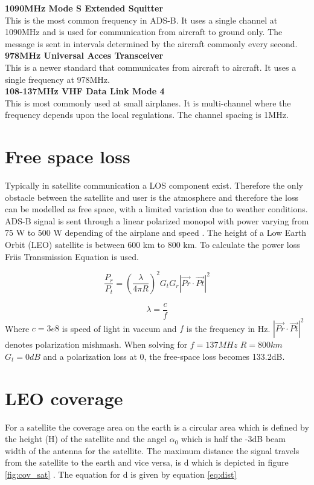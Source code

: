 \textbf{1090MHz Mode S Extended Squitter}\\
This is the most common frequency in ADS-B. It uses a single channel at 1090MHz and is used for communication from aircraft to ground only. The message is sent in intervals determined by the aircraft commonly every second.   
\\
\textbf{978MHz Universal Acces Transceiver}\\
This is a newer standard that communicates from aircraft to aircraft. It uses a single frequency at 978MHz.  
\\
\textbf{108-137MHz VHF Data Link Mode 4}\\
This is most commonly used at small airplanes. It is multi-channel where the frequency depends upon the local regulations. The channel spacing is 1MHz. 

\section{Free space loss}

Typically in satellite communication a LOS component exist. Therefore the only obstacle between the satellite and user is the atmosphere and therefore the loss can be modelled as free space, with a limited variation due to weather conditions. ADS-B signal is sent through a linear polarized monopol with power varying from 75 W to 500 W depending of the airplane and speed \citep{FlyingLab}. The height of a Low Earth Orbit (LEO) satellite is between 600 km to 800 km. To calculate the power loss Friis Transmission Equation is used. 

\begin{equation}
\frac{P_r}{P_t} = (\frac{\lambda}{4\pi R})^2 G_t G_r|\vec{Pr}\cdot \vec{Pt}|^2
\end{equation}

\begin{equation}
\lambda = \frac{c}{f}
\end{equation}
Where $c = 3e8$ is speed of light in vaccum and $ f$ is the frequency in Hz. $|\vec{Pr}\cdot \vec{Pt}|^2$ denotes polarization mishmash. When solving for $f = 137MHz$ $R=800km$  $G_t = 0 dB$ and a polarization loss at 0, the free-space loss becomes 133.2dB.

\section{LEO coverage}
For a satellite the coverage area on the earth is a circular area which is defined by the height (H) of the satellite and the angel $\alpha_0$ which is half the -3dB beam width of the antenna for the satellite. The maximum distance the signal travels from the satellite to the earth and vice versa, is d which is depicted in figure \ref{fig:cov_sat} \citep{Cakaj2014}. The equation for d is given by equation \ref{eq:dist} 

